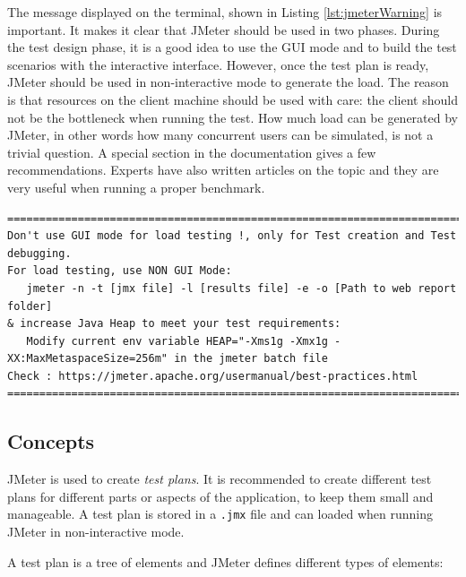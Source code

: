 The message displayed on the terminal, shown in Listing \ref{lst:jmeterWarning} is important. It makes it clear that JMeter should be used in two phases. During the test design phase, it is a good idea to use the \ac{GUI} mode and to build the test scenarios with the interactive interface. However, once the test plan is ready, JMeter should be used in non-interactive mode to generate the load. The reason is that resources on the client machine should be used with care: the client should not be the bottleneck when running the test. How much load can be generated by JMeter, in other words how many concurrent users can be simulated, is not a trivial question. A special section in the documentation gives a few recommendations. Experts have also written articles on the topic and they are very useful when running a proper benchmark.

\vspace{10pt}
\begin{minipage}{\linewidth}
\begin{lstlisting}[frame=single]
================================================================================
Don't use GUI mode for load testing !, only for Test creation and Test debugging.
For load testing, use NON GUI Mode:
   jmeter -n -t [jmx file] -l [results file] -e -o [Path to web report folder]
& increase Java Heap to meet your test requirements:
   Modify current env variable HEAP="-Xms1g -Xmx1g -XX:MaxMetaspaceSize=256m" in the jmeter batch file
Check : https://jmeter.apache.org/usermanual/best-practices.html
================================================================================
\end{lstlisting}
\end{minipage}

\subsection{Concepts}

JMeter is used to create \emph{test plans}. It is recommended to create different test plans for different parts or aspects of the application, to keep them small and manageable. A test plan is stored in a \texttt{.jmx} file and can loaded when running JMeter in non-interactive mode.

A test plan is a tree of elements and JMeter defines different types of elements:

